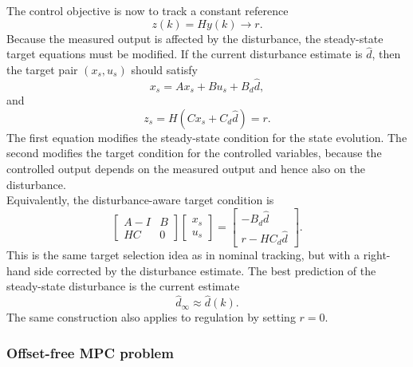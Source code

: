 The control objective is now to track a constant reference
\[
    z(k)=Hy(k)\to r.
\]
Because the measured output is affected by the disturbance, the steady-state target equations
must be modified. If the current disturbance estimate is \(\hat d\), then the target pair
\((x_s,u_s)\) should satisfy
\[
    x_s = Ax_s + Bu_s + B_d\hat d,
\]
and
\[
    z_s = H(Cx_s+C_d\hat d)=r.
\]
The first equation modifies the steady-state condition for the state evolution. The second
modifies the target condition for the controlled variables, because the controlled output depends
on the measured output and hence also on the disturbance.\\
Equivalently, the disturbance-aware target condition is
\[
    \begin{bmatrix}
        A-I & B\\
        HC  & 0
    \end{bmatrix}
    \begin{bmatrix}
        x_s\\ u_s
    \end{bmatrix}
    =
    \begin{bmatrix}
        -B_d\hat d\\
        r-HC_d\hat d
    \end{bmatrix}.
\]
This is the same target selection idea as in nominal tracking, but with a right-hand side corrected
by the disturbance estimate. The best prediction of the steady-state disturbance is the current
estimate
\[
    \hat d_\infty \approx \hat d(k).
\]
The same construction also applies to regulation by setting \(r=0\).

\subsubsection{Offset-free MPC problem}

